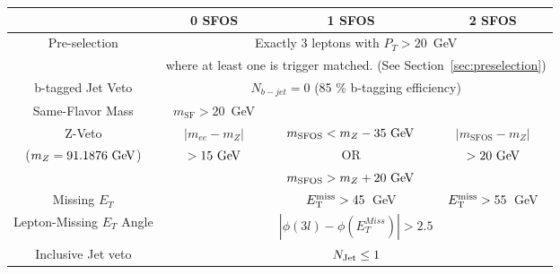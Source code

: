 \begin{tabular}{|c||c||c||c|}
\hline
&  0 SFOS  	& 1 SFOS		  & 2 SFOS  \\
\hline 
\hline 
\multirow{2}{*}{Pre-selection} & \multicolumn{3}{c|}{Exactly 3 leptons with $P_{T} > 20$~GeV}\\
                               & \multicolumn{3}{c|}{where at least one is trigger matched.  (See Section~\ref{sec:preselection}) }\\
\hline 
b-tagged Jet Veto	& \multicolumn{3}{c|}{$N_{b-jet} = 0$ (85 \% b-tagging efficiency)} \\
\hline 
Same-Flavor Mass &	$m_{\textrm{SF}} > 20$~GeV	& \multicolumn{2}{c|}{} \\
\hline 
Z-Veto                &  $|m_{ee}-m_Z|$ & $m_{\textrm{SFOS}} < m_{Z}-35\GeV$ & $|m_{\textrm{SFOS}}-m_Z|$ \\
($m_Z = 91.1876\GeV$)  &  $>15\GeV$                                         & OR   &  $>20\GeV$\\
                      & 					  & $m_{\textrm{SFOS}}>m_{Z}+20\GeV$	   &  \\
\hline 
Missing $E_{T}$		& 		& $E_{\mathrm{T}}^{\mathrm{miss}} > 45$~GeV & $E_{\mathrm{T}}^{\mathrm{miss}} > 55$~GeV \\
\hline 
Lepton-Missing $E_{T}$ Angle 	& 	\multicolumn{3}{c|}{$|\phi(3l)-\phi(E_{T}^{Miss})| > 2.5$} \\
\hline 
Inclusive Jet veto	& \multicolumn{3}{c|}{$N_{\textrm{Jet}} \leq 1$} \\
\hline 
\end{tabular}
